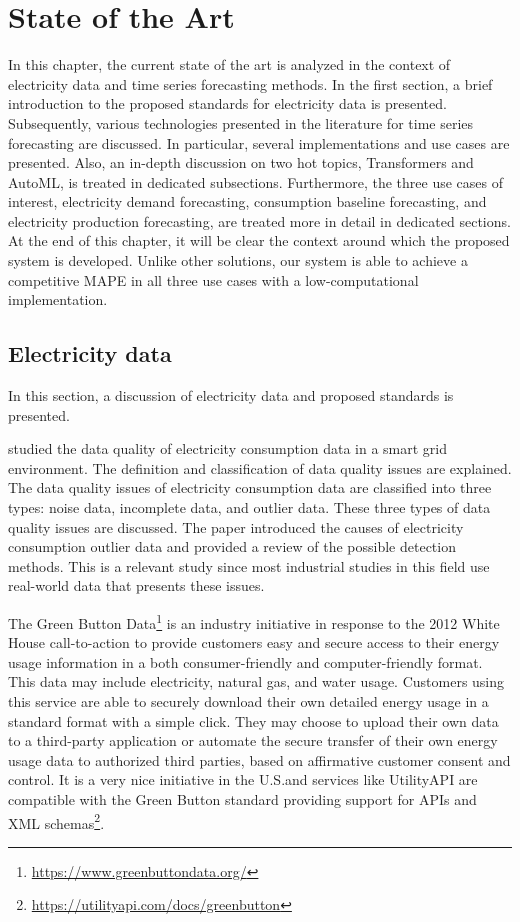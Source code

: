 \chapter{State of the Art}
\label{cha:soa}
\vspace{0.4 cm}

In this chapter, the current state of the art is analyzed in the context of electricity data and time series forecasting methods.
In the first section, a brief introduction to the proposed standards for electricity data is presented.
Subsequently, various technologies presented in the literature for time series forecasting are discussed.
In particular, several implementations and use cases are presented.
Also, an in-depth discussion on two hot topics, Transformers and AutoML, is treated in dedicated subsections.
Furthermore, the three use cases of interest, electricity demand forecasting, consumption baseline forecasting, and electricity production forecasting, are treated more in detail in dedicated sections.
At the end of this chapter, it will be clear the context around which the proposed system is developed.
Unlike other solutions, our system is able to achieve a competitive MAPE in all three use cases with a low-computational implementation.


\section{Electricity data}
\label{sec:data}
\vspace{0.2 cm}

In this section, a discussion of electricity data and proposed standards is presented.

\cite{CHEN201798} studied the data quality of electricity consumption data in a smart grid environment.
The definition and classification of data quality issues are explained.
The data quality issues of electricity consumption data are classified into three types: noise data, incomplete data, and outlier data.
These three types of data quality issues are discussed.
The paper introduced the causes of electricity consumption outlier data and provided a review of the possible detection methods.
This is a relevant study since most industrial studies in this field use real-world data that presents these issues.

The Green Button Data\footnote{ \url{https://www.greenbuttondata.org/} } is an industry initiative in response to the 2012 White House call-to-action to provide customers easy and secure access to their energy usage information in a both consumer-friendly and computer-friendly format.
This data may include electricity, natural gas, and water usage.
Customers using this service are able to securely download their own detailed energy usage in a standard format with a simple click.
They may choose to upload their own data to a third-party application or automate the secure transfer of their own energy usage data to authorized third parties, based on affirmative customer consent and control.
It is a very nice initiative in the U.S.and services like UtilityAPI are compatible with the Green Button standard providing support for APIs and XML schemas\footnote{ \url{https://utilityapi.com/docs/greenbutton} }.

